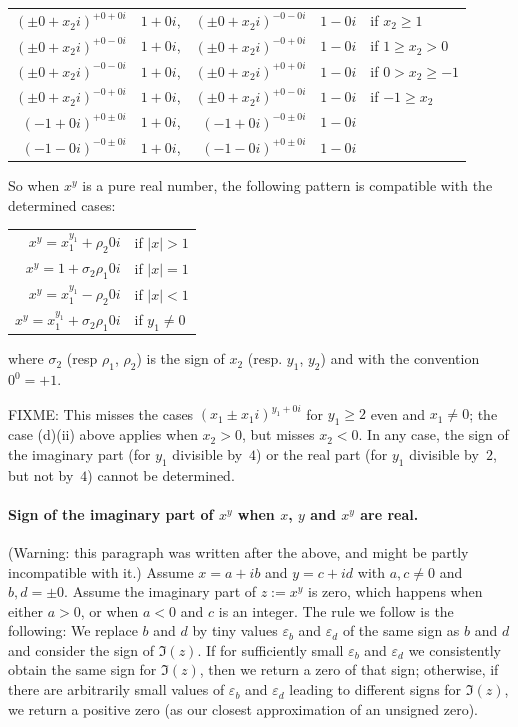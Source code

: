 \documentclass [11pt]{article}
\renewcommand {\geq}{\geqslant}
\begin{document}
\begin{tabular}{r@{ $=$ }lr@{ $=$ }ll}
  $(\pm 0 +x_2i)^{+0 +0i}$ & $1 +0i$, &
  $(\pm 0 +x_2i)^{-0 -0i}$ & $1 -0i$ &
  if $x_2 \geq 1$ \\
  $(\pm 0 +x_2i)^{+0 -0i}$ & $1 +0i$, &
  $(\pm 0 +x_2i)^{-0 +0i}$ & $1 -0i$ &
  if $1 \geq x_2 > 0$ \\
  $(\pm 0 +x_2i)^{-0 -0i}$ & $1 +0i$, &
  $(\pm 0 +x_2i)^{+0 +0i}$ & $1 -0i$ &
  if $ 0 > x_2 \geq -1$ \\
  $(\pm 0 +x_2i)^{-0 +0i}$ & $1 +0i$, &
  $(\pm 0 +x_2i)^{+0 -0i}$ & $1 -0i$ &
  if $-1 \geq x_2$ \\

  $(-1 +0i)^{+0 \pm0i}$ & $1+0i$, &
  $(-1 +0i)^{-0 \pm0i}$ & $1-0i$ \\
  $(-1 -0i)^{-0 \pm0i}$ & $1+0i$, &
  $(-1 -0i)^{+0 \pm0i}$ & $1-0i$ \\
\end{tabular}

So when $x^y$ is a pure real number, the following pattern is compatible with
the determined cases:

\begin{tabular}{rl}
  $x^y = x_1^{y_1} + \rho_2 0i$ & if $|x| > 1$\\
  $x^y = 1 + \sigma_2 \rho_1 0i$ & if $|x| = 1$\\
  $x^y = x_1^{y_1} - \rho_2 0i$ & if $|x| < 1$\\
  $x^y = x_1^{y_1} + \sigma_2 \rho_1 0i$ & if $y_1 \neq 0$
\end{tabular}

where $\sigma_2$ (resp $\rho_1$, $\rho_2$) is the sign of $x_2$ (resp. $y_1$,
$y_2$) and with the convention $0^0=+1$.

FIXME: This misses the cases $(x_1 \pm x_1 i)^{y_1 + 0 i}$ for $y_1 \geq 2$
even and $x_1 \neq 0$; the case (d)(ii) above applies when $x_2 > 0$, but
misses $x_2 < 0$. In any case, the sign of the imaginary part
(for $y_1$ divisible by~$4$)
or the real part
(for $y_1$ divisible by~$2$, but not by~$4$)
cannot be determined.

\paragraph{Sign of the imaginary part of $x^y$ when
$x$, $y$ and $x^y$ are real.}
(Warning: this paragraph was written after the above, and might be
partly incompatible with it.)
Assume $x = a + i b$ and $y = c + i d$ with $a, c \neq 0$ and $b, d = \pm 0$.
Assume the imaginary part of $z := x^y$ is zero, which happens when
either $a > 0$, or when $a < 0$ and $c$ is an integer.
The rule we follow is the following: We replace $b$ and $d$ by tiny
values $\varepsilon_b$ and $\varepsilon_d$ of the same sign as $b$ and $d$
and consider the sign of $\Im(z)$. If for sufficiently small
$\varepsilon_b$ and $\varepsilon_d$ we consistently obtain the same sign
for $\Im(z)$, then we return a zero of that sign;
otherwise, if there are arbitrarily small values of
$\varepsilon_b$ and $\varepsilon_d$ leading to different signs
for $\Im(z)$, we return a positive zero (as our closest approximation
of an unsigned zero).
\end{document}
